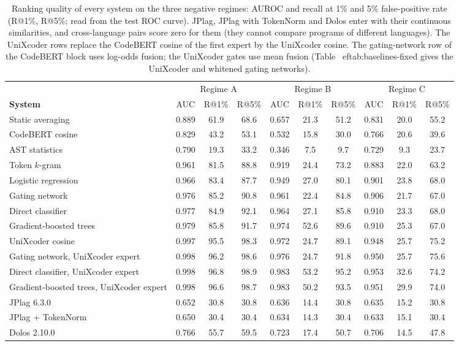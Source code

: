 \begin{table}[t]
\centering
\caption{Ranking quality of every system on the three negative regimes: AUROC and recall at 1\% and 5\% false-positive rate (R@1\%, R@5\%; read from the test ROC curve). JPlag, JPlag with TokenNorm and Dolos enter with their continuous similarities, and cross-language pairs score zero for them (they cannot compare programs of different languages). The UniXcoder rows replace the CodeBERT cosine of the first expert by the UniXcoder cosine. The gating-network row of the CodeBERT block uses log-odds fusion; the UniXcoder gates use mean fusion (Table~
ef{tab:baselines-fixed} gives the UniXcoder and whitened gating networks).}
\label{tab:operating-all}
\footnotesize
\setlength{\tabcolsep}{3pt}
\begin{tabular}{l|ccc|ccc|ccc}
\toprule
 & \multicolumn{3}{c|}{Regime A} & \multicolumn{3}{c|}{Regime B} & \multicolumn{3}{c}{Regime C} \\
\textbf{System} & AUC & R@1\% & R@5\% & AUC & R@1\% & R@5\% & AUC & R@1\% & R@5\% \\
\midrule
Static averaging & 0.889 & 61.9 & 68.6 & 0.657 & 21.3 & 51.2 & 0.831 & 20.0 & 55.2 \\
CodeBERT cosine & 0.829 & 43.2 & 53.1 & 0.532 & 15.8 & 30.0 & 0.766 & 20.6 & 39.6 \\
AST statistics & 0.790 & 19.3 & 33.2 & 0.346 & 7.5 & 9.7 & 0.729 & 9.3 & 23.7 \\
Token $k$-gram & 0.961 & 81.5 & 88.8 & 0.919 & 24.4 & 73.2 & 0.883 & 22.0 & 63.2 \\
Logistic regression & 0.966 & 83.4 & 87.7 & 0.949 & 27.0 & 80.1 & 0.901 & 23.8 & 68.0 \\
Gating network & 0.976 & 85.2 & 90.8 & 0.961 & 22.4 & 84.8 & 0.906 & 21.7 & 67.0 \\
Direct classifier & 0.977 & 84.9 & 92.1 & 0.964 & 27.1 & 85.8 & 0.910 & 23.3 & 68.0 \\
Gradient-boosted trees & 0.979 & 85.8 & 91.7 & 0.974 & 52.6 & 89.6 & 0.910 & 25.3 & 67.0 \\
\midrule
UniXcoder cosine & 0.997 & 95.5 & 98.3 & 0.972 & 24.7 & 89.1 & 0.948 & 25.7 & 75.2 \\
Gating network, UniXcoder expert & 0.998 & 96.2 & 98.6 & 0.976 & 24.7 & 91.8 & 0.950 & 25.7 & 75.6 \\
Direct classifier, UniXcoder expert & 0.998 & 96.8 & 98.9 & 0.983 & 53.2 & 95.2 & 0.953 & 32.6 & 74.2 \\
Gradient-boosted trees, UniXcoder expert & 0.998 & 96.6 & 98.7 & 0.983 & 50.2 & 93.5 & 0.951 & 29.9 & 74.0 \\
\midrule
JPlag 6.3.0 & 0.652 & 30.8 & 30.8 & 0.636 & 14.4 & 30.8 & 0.635 & 15.2 & 30.8 \\
JPlag + TokenNorm & 0.650 & 30.4 & 30.4 & 0.634 & 14.3 & 30.4 & 0.633 & 15.1 & 30.4 \\
Dolos 2.10.0 & 0.766 & 55.7 & 59.5 & 0.723 & 17.4 & 50.7 & 0.706 & 14.5 & 47.8 \\
\bottomrule
\end{tabular}
\end{table}